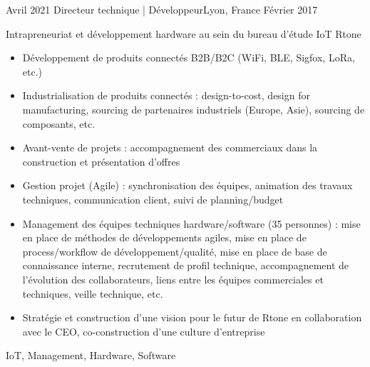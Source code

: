\begin{experiences}
  \experience
    {Avril 2021}   {Directeur technique | Développeur}{}{Lyon, France}
    {Février 2017} {
                      Intrapreneuriat et développement hardware au sein du bureau d'étude IoT Rtone
                      \begin{itemize}
                        \item Développement de produits connectés B2B/B2C (WiFi, BLE, Sigfox, LoRa, etc.)
                        \item Industrialisation de produits connectés : design-to-cost, design for manufacturing, sourcing de partenaires industriels (Europe, Asie), sourcing de composants, etc.
                        \item Avant-vente de projets : accompagnement des commerciaux dans la construction et présentation d'offres
                        \item Gestion projet (Agile) : synchronisation des équipes, animation des travaux techniques, communication client, suivi de planning/budget
                        \item Management des équipes techniques hardware/software (35 personnes) : mise en place de méthodes de développements agiles, mise en place de process/workflow de développement/qualité, mise en place de base de connaissance interne, recrutement de profil technique, accompagnement de l'évolution des collaborateurs, liens entre les équipes commerciales et techniques, veille technique, etc.
                        \item Stratégie et construction d'une vision pour le futur de Rtone en collaboration avec le CEO, co-construction d'une culture d'entreprise
                      \end{itemize}
                    }
                    {IoT, Management, Hardware, Software}
                    
  \emptySeparator


\end{experiences}
